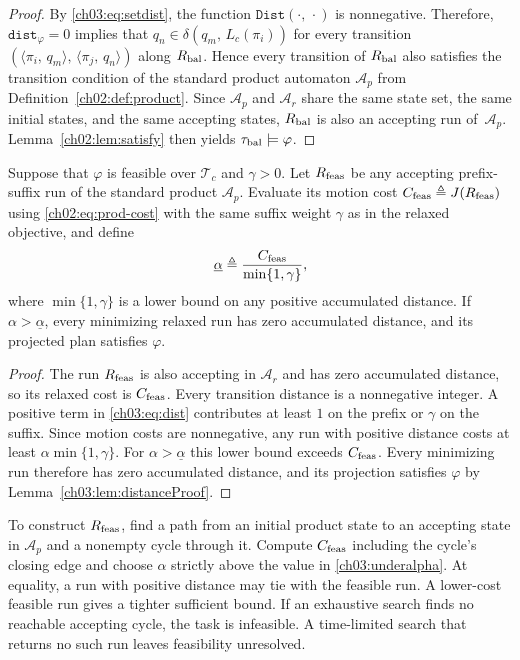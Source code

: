 \begin{proof}
By \eqref{ch03:eq:setdist}, the function $\texttt{Dist}(\cdot,\, \cdot)$ is
nonnegative. Therefore, $\texttt{dist}_{\varphi} = 0$ implies that
$q_n \in \delta(q_m,\, L_c(\pi_i))$ for every transition
$(\langle \pi_i,\, q_m \rangle,\,
\langle \pi_j,\, q_n \rangle)$ along $R_{\textup{bal}}$. Hence every
transition of $R_{\textup{bal}}$ also satisfies the transition condition of the
standard product automaton $\mathcal{A}_p$ from
Definition~\ref{ch02:def:product}. Since $\mathcal{A}_p$ and $\mathcal{A}_r$
share the same state set, the same initial states, and the same accepting
states, $R_{\textup{bal}}$ is also an accepting run of~$\mathcal{A}_p$.
Lemma~\ref{ch02:lem:satisfy} then yields
$\tau_{\textup{bal}} \models \varphi$.
\end{proof}


\begin{revision}
\begin{theorem}\label{ch03:thm:balanced-feasible}
Suppose that $\varphi$ is feasible over $\mathcal{T}_c$ and $\gamma>0$.
Let $R_{\textup{feas}}$ be any accepting prefix-suffix run of the standard
product $\mathcal{A}_p$. Evaluate its motion cost
$C_{\textup{feas}}\triangleq J(R_{\textup{feas}})$ using
\eqref{ch02:eq:prod-cost} with the same suffix weight $\gamma$ as in the
relaxed objective, and define
\begin{equation}
\underline{\alpha}\triangleq
\frac{C_{\textup{feas}}}{\min\{1,\gamma\}},
\label{ch03:underalpha}
\end{equation}
where $\min\{1,\gamma\}$ is a lower bound on any positive accumulated distance.
If $\alpha>\underline{\alpha}$, every minimizing relaxed run has zero
accumulated distance, and its projected plan satisfies $\varphi$.
\end{theorem}

\begin{proof}
The run $R_{\textup{feas}}$ is also accepting in $\mathcal{A}_r$ and has
zero accumulated distance, so its relaxed cost is $C_{\textup{feas}}$.
Every transition distance is a nonnegative integer. A positive term in
\eqref{ch03:eq:dist} contributes at least $1$ on the prefix or $\gamma$
on the suffix. Since motion costs are nonnegative, any run with positive
distance costs at least $\alpha\min\{1,\gamma\}$. For
$\alpha>\underline{\alpha}$ this lower bound exceeds $C_{\textup{feas}}$.
Every minimizing run therefore has zero accumulated distance, and its
projection satisfies $\varphi$ by Lemma~\ref{ch03:lem:distanceProof}.
\end{proof}

To construct $R_{\textup{feas}}$, find a path from an initial product state
to an accepting state in $\mathcal{A}_p$ and a nonempty cycle through it.
Compute $C_{\textup{feas}}$ including the cycle's closing edge and choose
$\alpha$ strictly above the value in \eqref{ch03:underalpha}. At equality, a run with
positive distance may tie with the feasible run. A lower-cost feasible run
gives a tighter sufficient bound. If an exhaustive search finds no reachable
accepting cycle, the task is infeasible. A time-limited search that returns
no such run leaves feasibility unresolved.
\end{revision}



